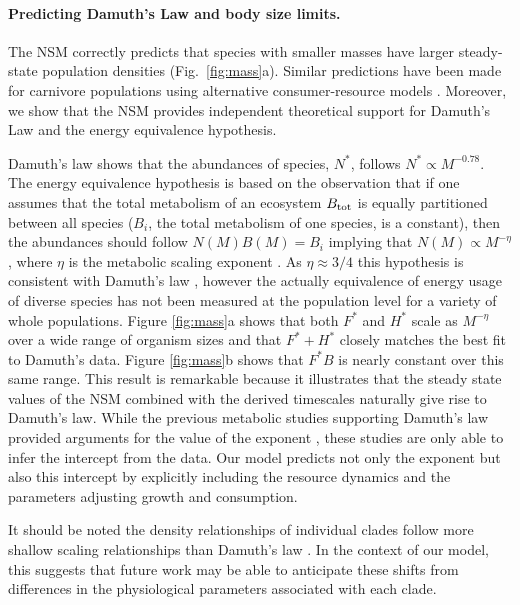 \documentclass[twocolumn,preprintnumbers,amsmath,amssymb,superscriptaddress]{revtex4}
\begin{document}
\noindent \paragraph*{{\bf Predicting Damuth's Law and body size limits.}} The NSM correctly predicts that species with smaller masses have larger
steady-state population densities (Fig.~\ref{fig:mass}a).  Similar
predictions have been made for carnivore populations using alternative
consumer-resource models \citep{DeLong:2012kw}.  Moreover, we show that the
NSM provides independent theoretical support for Damuth's Law and the energy equivalence
hypothesis\citep{Damuth:1987kr,allen2002,enquist1998,pedersen2017shallow}. {\color{red} Damuth's law shows that the  abundances of species, $N^{*}$, follows $N^*\propto M^{-0.78}$. The energy equivalence hypothesis is based on the observation that if one assumes that the total metabolism of an ecosystem $B_{\rm tot}$ is equally partitioned between all species ($B_{i}$, the total metabolism of one species, is a constant), then the abundances should follow $N\left(M\right)B\left(M\right)=B_{i}$ implying that $N\left(M\right)\propto M^{-\eta}$, where $\eta$ is the metabolic scaling exponent \citep{allen2002,enquist1998}. As $\eta \approx 3/4$ this hypothesis is consistent with Damuth's law \citep{allen2002}, however the actually equivalence of energy usage of diverse species has not been measured at the population level for a variety of whole populations. Figure \ref{fig:mass}a shows
that both $F^{*}$ and $H^{*}$ scale as $M^{-\eta}$ over a wide range of
organism sizes and that $F^{*}+H^{*}$ closely matches the best fit to Damuth's data. Figure \ref{fig:mass}b shows that $F^{*}B$ is nearly constant over this same range.  This result is remarkable because it
illustrates that the steady state values of the NSM combined with the derived
timescales naturally give rise to Damuth's law. While the previous metabolic studies supporting Damuth's law provided arguments for the value of the exponent \citep{allen2002}, these studies are only able to infer the intercept from the data. Our model predicts not only the exponent but also this intercept by explicitly including the resource dynamics and the parameters adjusting growth and consumption. 

It should be noted the density relationships of individual clades follow more shallow scaling relationships than Damuth's law \cite{pedersen2017shallow}. In the context of our model, this suggests that future work may be able to anticipate these shifts from differences in the physiological parameters associated with each clade.}
\end{document}
